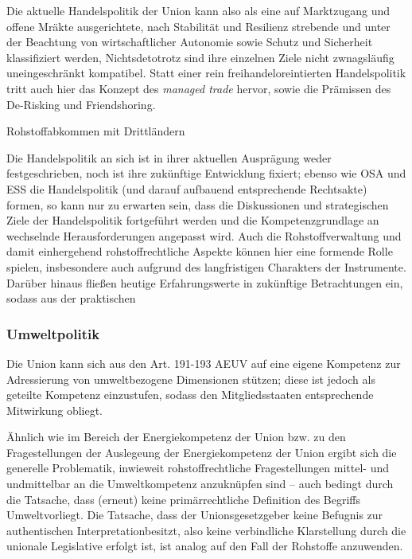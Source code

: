 \documentclass[12pt,a4paper,oneside]{book} %
\begin{document}
Die aktuelle Handelspolitik der Union kann also als eine auf Marktzugang und offene Mräkte ausgerichtete, nach Stabilität und Resilienz strebende und unter der Beachtung von wirtschaftlicher Autonomie sowie Schutz und Sicherheit klassifiziert werden,\autocite{RdTW 2024, 216} Nichtsdetotrotz sind ihre einzelnen Ziele nicht zwnagsläufig uneingeschränkt kompatibel.\autocite{RdTW 2024, 206} Statt einer rein freihandeloreintierten Handelspolitik tritt auch hier das Konzept des \textit{managed trade} hervor, sowie die Prämissen des De-Risking und Friendshoring.
	
	
Rohstoffabkommen mit Drittländern

Die Handelspolitik an sich ist in ihrer aktuellen Ausprägung weder festgeschrieben, noch ist ihre zukünftige Entwicklung fixiert; ebenso wie OSA und ESS die Handelspolitik (und darauf aufbauend entsprechende Rechtsakte) formen, so kann nur zu erwarten sein, dass die Diskussionen und strategischen Ziele der Handelspolitik fortgeführt werden und die Kompetenzgrundlage an wechselnde Herausforderungen angepasst wird. Auch die Rohstoffverwaltung und damit einhergehend rohstoffrechtliche Aspekte können hier eine formende Rolle spielen, insbesondere auch aufgrund des langfristigen Charakters der Instrumente. Darüber hinaus fließen heutige Erfahrungswerte in zukünftige Betrachtungen ein, sodass aus der praktischen 
	
	
\subsubsection{Umweltpolitik}
Die Union kann sich aus den Art. 191-193 AEUV auf eine eigene Kompetenz zur Adressierung von umweltbezogene Dimensionen stützen; diese ist jedoch als geteilte Kompetenz einzustufen, sodass den Mitgliedsstaaten entsprechende Mitwirkung obliegt.
	
Ähnlich wie im Bereich der Energiekompetenz der Union bzw. zu den Fragestellungen der Auslegeung der Energiekompetenz der Union ergibt sich die generelle Problematik, inwieweit rohstoffrechtliche Fragestellungen mittel- und undmittelbar an die Umweltkompetenz anzuknüpfen sind -- auch bedingt durch die Tatsache, dass (erneut) keine primärrechtliche Definition des Begriffs \glqq Umwelt\grqq vorliegt. Die Tatsache, dass der Unionsgesetzgeber \glqq keine Befugnis zur authentischen Interpretation\grqq besitzt,\autocite{Grabitz Hilf Nettesheim, Art. 191 Rn. 49} also keine verbindliche Klarstellung durch die unionale Legislative erfolgt ist,  ist analog auf den Fall der Rohstoffe anzuwenden.
	
\end{document}
